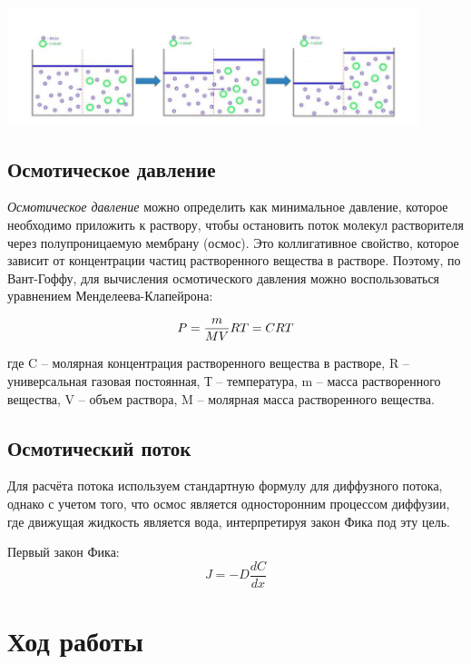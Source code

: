\documentclass{article}
\begin{document}
            \includegraphics[width=0.9\textwidth]{Osmos.png}
        
        \newpage
        \subsection*{Осмотическое давление}
            \hspace*{4mm}\textit{Осмотическое давление} можно определить как минимальное давление, которое необходимо
            приложить к раствору, чтобы остановить поток молекул растворителя через
            полупроницаемую мембрану (осмос). Это коллигативное свойство, которое
            зависит от концентрации частиц растворенного вещества в растворе. Поэтому, по
            Вант-Гоффу, для вычисления осмотического давления можно воспользоваться
            уравнением Менделеева-Клапейрона:

            $$P = \frac{m}{MV} \* RT = CRT$$

            где C – молярная концентрация растворенного вещества в растворе, R –
            универсальная газовая постоянная, Т – температура, m – масса растворенного
            вещества, V – объем раствора, M – молярная масса растворенного вещества.

        \subsection*{Осмотический поток}
            \hspace*{4mm}Для расчёта потока используем стандартную формулу для диффузного потока, однако с учетом того, что осмос
            является односторонним процессом диффузии, где движущая жидкость является
            вода, интерпретируя закон Фика под эту цель.

            Первый закон Фика:
            $$J = -D\frac{dC}{dx}$$
            
    \newpage
    \section*{Ход работы}
\end{document}
